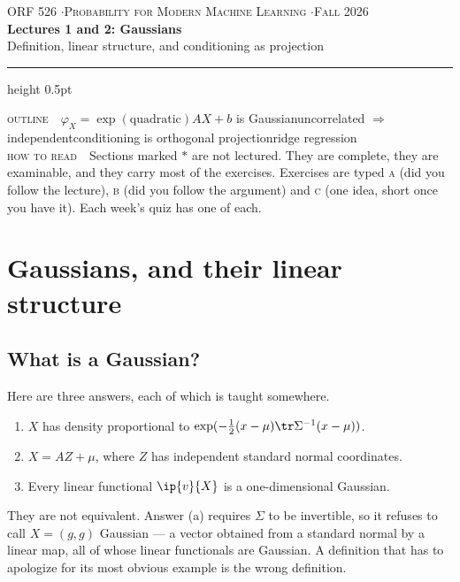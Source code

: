 \documentclass[11pt]{article}
\begin{document}
\begin{center}
{\footnotesize\color{acc}\textsc{ORF 526 \quad$\cdot$\quad Probability for Modern Machine Learning \quad$\cdot$\quad Fall 2026}}\\[0.5em]
{\LARGE\bfseries Lectures 1 and 2: Gaussians}\\[0.35em]
{\color{grey} Definition, linear structure, and conditioning as projection}
\end{center}
\vspace{0.4em}
\hrule height 0.5pt
\vspace{0.6em}

\begin{roadmap}
{\color{acc}\textsc{outline}}\ \ $\varphi_X=\exp(\text{quadratic})$\rmto$AX+b$ is Gaussian\rmto uncorrelated $\Rightarrow$ independent\rmto conditioning is orthogonal projection\rmto ridge regression\\[0.35em]
{\color{acc}\textsc{how to read}}\ \ Sections marked \textcolor{acc}{$\ast$} are not lectured. They are complete, they are examinable, and they carry most of the exercises. Exercises are typed \textsc{a} (did you follow the lecture), \textsc{b} (did you follow the argument) and \textsc{c} (one idea, short once you have it). Each week's quiz has one of each.
\end{roadmap}

\section{Gaussians, and their linear structure}

\subsection{What is a Gaussian?}

Here are three answers, each of which is taught somewhere.

\begin{enumerate}[label=(\alph*),leftmargin=1.6em,itemsep=0.15em]
\item $X$ has density proportional to $\exp(-\tfrac12 (x-\mu)\tr\Sigma^{-1}(x-\mu))$.
\item $X=AZ+\mu$, where $Z$ has independent standard normal coordinates.
\item Every linear functional $\ip{v}{X}$ is a one-dimensional Gaussian.
\end{enumerate}

They are not equivalent. Answer (a) requires $\Sigma$ to be invertible, so it refuses to call $X=(g,g)$ Gaussian --- a vector obtained from a standard normal by a linear map, all of whose linear functionals are Gaussian. A definition that has to apologize for its most obvious example is the wrong definition.
\end{document}
